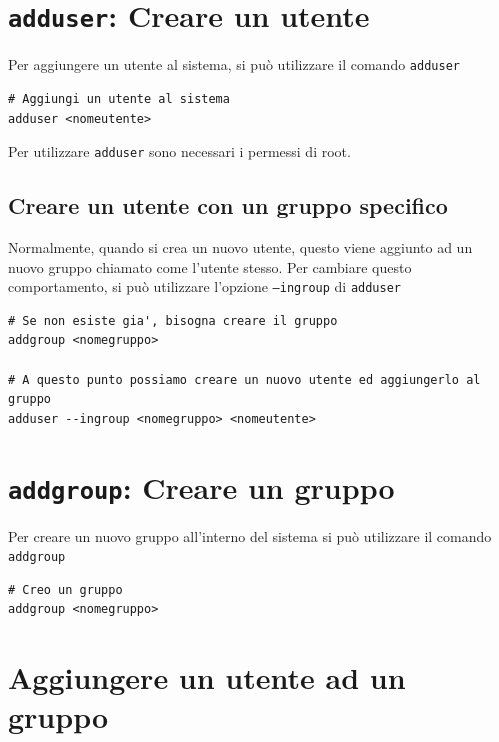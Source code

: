 \documentclass[a4paper]{report}
\newenvironment{ricordati}{\begin{tcolorbox}[fonttitle=\sffamily\bfseries\large,title=Ricordati,colframe=orange!75!white]}{\end{tcolorbox}}
\newenvironment{code}{\begin{tcolorbox}[size=small]}{\end{tcolorbox}}
\begin{document}
\section{\texttt{adduser}: Creare un utente}

Per aggiungere un utente al sistema, si può utilizzare il comando \texttt{adduser}

\begin{code} 
\begin{lstlisting}
# Aggiungi un utente al sistema
adduser <nomeutente>
\end{lstlisting}
\end{code}

\begin{ricordati}
	Per utilizzare \texttt{adduser} sono necessari i permessi di root.
\end{ricordati}

\subsection{Creare un utente con un gruppo specifico}

Normalmente, quando si crea un nuovo utente, questo viene aggiunto ad un nuovo gruppo chiamato come l'utente stesso. Per cambiare questo comportamento, si può utilizzare l'opzione \texttt{--ingroup} di \texttt{adduser}

\begin{code} 
\begin{lstlisting}
# Se non esiste gia', bisogna creare il gruppo
addgroup <nomegruppo>

# A questo punto possiamo creare un nuovo utente ed aggiungerlo al gruppo
adduser --ingroup <nomegruppo> <nomeutente>
\end{lstlisting}
\end{code}

\section{\texttt{addgroup}: Creare un gruppo}

Per creare un nuovo gruppo all'interno del sistema si può utilizzare il comando \texttt{addgroup}
\begin{code} 
\begin{lstlisting}
# Creo un gruppo
addgroup <nomegruppo>
\end{lstlisting}
\end{code}

\section{Aggiungere un utente ad un gruppo}
\end{document}
